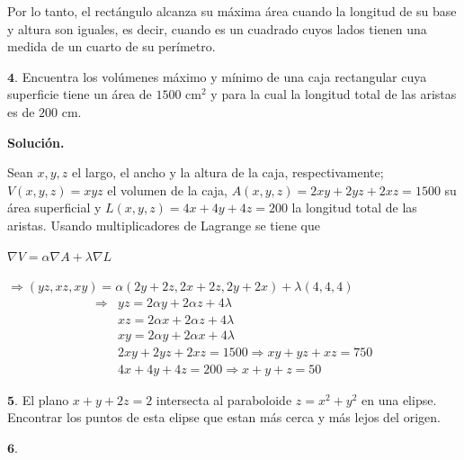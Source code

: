 \documentclass[fleqn, 12pt]{article}
\begin{document}
\begin{list}{\bfseries Ejercicio}{ \addtolength{\itemindent}{-1mm}%
    \addtolength{\labelsep}{-1mm}%
    \addtolength{\leftmargin}{-1cm}%
    \addtolength{\labelwidth}{-1cm} }
    Por lo tanto, el rectángulo alcanza su máxima área cuando la longitud de su base y altura son iguales, es decir, cuando es un cuadrado cuyos lados tienen una medida de un cuarto de su perímetro.

    \item $ \mathbf{4.} $ Encuentra los volúmenes máximo y mínimo de una caja rectangular cuya superficie tiene un área de $ 1500 \text{ cm}^2 $ y para la cual la longitud total de las aristas es de $ 200 $ cm.
    
    \textbf{Solución.}

    Sean $ x,y,z $ el largo, el ancho y la altura de la caja, respectivamente; $ V(x,y,z) = xyz $ el volumen de la caja, $ A(x,y,z) = 2xy + 2yz + 2xz = 1500 $ su área superficial y $ L(x,y,z) = 4x + 4y + 4z = 200 $ la longitud total de las aristas. Usando multiplicadores de Lagrange se tiene que

    $ \nabla V = \alpha \nabla A + \lambda \nabla L $

    $ \Longrightarrow (yz, xz, xy) = \alpha (2y + 2z, 2x + 2z, 2y + 2x) + \lambda (4,4,4) $
    \begin{align}
        \Longrightarrow & yz = 2 \alpha y + 2 \alpha z + 4 \lambda \label{eq:41} \\
        & xz = 2 \alpha x + 2 \alpha z + 4 \lambda \label{eq:42} \\
        & xy = 2 \alpha y + 2 \alpha x + 4 \lambda \label{eq:43} \\
        & 2xy + 2yz + 2xz = 1500 \Longrightarrow xy + yz + xz = 750 \label{eq:44} \\
        & 4x + 4y + 4z = 200 \Longrightarrow x + y + z = 50 \label{eq:45}
    \end{align}



    \item $ \mathbf{5.} $ El plano $ x + y + 2z = 2 $ intersecta al paraboloide $ z = x^2 + y^2 $ en una elipse. Encontrar los puntos de esta elipse que estan más cerca y más lejos del origen.
    
    \item $ \mathbf{6.} $ 
    

\end{list}
\end{document}
